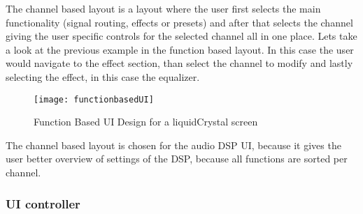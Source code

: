 The channel based layout is a layout where the user first selects the main functionality (signal routing, effects or presets) and after that selects the channel giving the user specific controls for the selected channel all in one place. Lets take a look at the previous example in the function based layout. In this case the user would navigate to the effect section, than select the channel to modify and lastly selecting the effect, in this case the equalizer.

\begin{figure}[ht]
    \texttt{[image: functionbasedUI]}
    \caption{Function Based UI Design for a liquidCrystal screen}
    \label{fig:functionbasedUI}
\end{figure}

The channel based layout is chosen for the audio DSP UI, because it gives the user better overview of settings of the DSP, because all functions are sorted per channel.

\subsubsection{UI controller}




